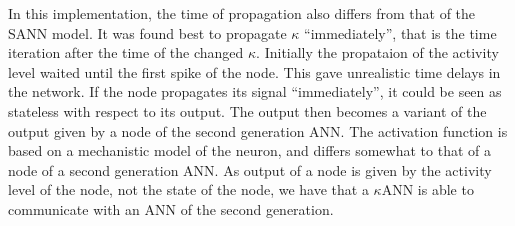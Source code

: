 In this implementation, the time of propagation also differs from that of the SANN model. 
It was found best to propagate $\kappa$ ``immediately'', that is the time iteration after the time of the changed $\kappa$.
Initially the propataion of the activity level waited until the first spike of the node. This gave unrealistic time delays in the network. %
%
If the node propagates its signal ``immediately'', it could be seen as stateless with respect to its output. %
The output then becomes a variant of the output given by a node of the second generation ANN.
The activation function is based on a mechanistic model of the neuron, and differs somewhat to that of a node of a second generation ANN.
As output of a node is given by the activity level of the node, not the state of the node, we have that a $\kappa$ANN is able to communicate with an ANN of the second generation.

